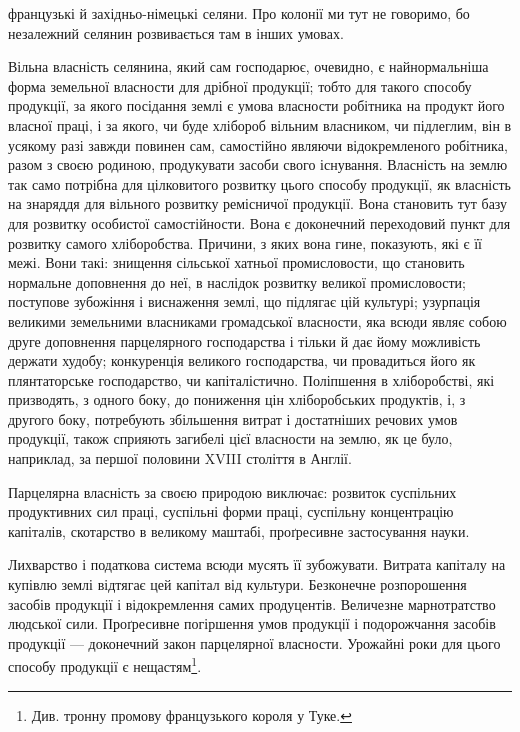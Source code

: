 \parcont{}  %
французькі й західньо-німецькі селяни. Про колонії ми тут не говоримо, бо
незалежний селянин розвивається там в інших умовах.

Вільна власність селянина, який сам господарює, очевидно, є найнормальніша
форма земельної власности для дрібної продукції; тобто для такого способу
продукції, за якого посідання землі є умова власности робітника на продукт
його власної праці, і за якого, чи буде хлібороб вільним власником, чи підлеглим,
він в усякому разі завжди повинен сам, самостійно являючи відокремленого
робітника, разом з своєю родиною, продукувати засоби свого існування. Власність
на землю так само потрібна для цілковитого розвитку цього способу продукції,
як власність на знаряддя для вільного розвитку ремісничої продукції. Вона
становить тут базу для розвитку особистої самостійности. Вона є доконечний
переходовий пункт для розвитку самого хліборобства. Причини, з яких вона
гине, показують, які є її межі. Вони такі: знищення сільської хатньої промисловости,
що становить нормальне доповнення до неї, в наслідок розвитку
великої промисловости; поступове зубожіння і виснаження землі, що підлягає
цій культурі; узурпація великими земельними власниками громадської власности,
яка всюди являє собою друге доповнення парцелярного господарства і
тільки й дає йому можливість держати худобу; конкуренція великого господарства,
чи провадиться його як плянтаторське господарство, чи капіталістично.
Поліпшення в хліборобстві, які призводять, з одного боку, до пониження цін
хліборобських продуктів, і, з другого боку, потребують збільшення витрат і
достатніших речових умов продукції, також сприяють загибелі цієї власности
на землю, як це було, наприклад, за першої половини XVIII століття в Англії.

Парцелярна власність за своєю природою виключає: розвиток суспільних
продуктивних сил праці, суспільні форми праці, суспільну концентрацію капіталів,
скотарство в великому маштабі, проґресивне застосування науки.

Лихварство і податкова система всюди мусять її зубожувати. Витрата капіталу
на купівлю землі відтягає цей капітал від культури. Безконечне розпорошення
засобів продукції і відокремлення самих продуцентів. Величезне марнотратство
людської сили. Проґресивне погіршення умов продукції і подорожчання
засобів продукції — доконечний закон парцелярної власности. Урожайні роки для
цього способу продукції є нещастям\footnote{
Див. тронну промову французького короля у Туке.
}.

